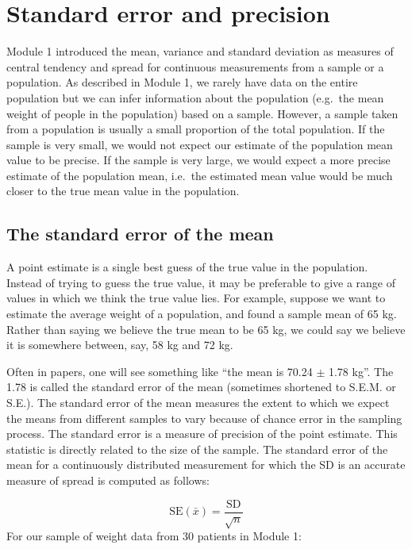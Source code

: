 \documentclass[
]{memoir}
\begin{document}
\hypertarget{standard-error-and-precision}{%
\section{Standard error and precision}\label{standard-error-and-precision}}

Module 1 introduced the mean, variance and standard deviation as measures of central tendency and spread for continuous measurements from a sample or a population. As described in Module 1, we rarely have data on the entire population but we can infer information about the population (e.g.~the mean weight of people in the population) based on a sample. However, a sample taken from a population is usually a small proportion of the total population. If the sample is very small, we would not expect our estimate of the population mean value to be precise. If the sample is very large, we would expect a more precise estimate of the population mean, i.e.~the estimated mean value would be much closer to the true mean value in the population.

\hypertarget{the-standard-error-of-the-mean}{%
\subsection{The standard error of the mean}\label{the-standard-error-of-the-mean}}

A point estimate is a single best guess of the true value in the population. Instead of trying to guess the true value, it may be preferable to give a range of values in which we think the true value lies. For example, suppose we want to estimate the average weight of a population, and found a sample mean of 65 kg. Rather than saying we believe the true mean to be 65 kg, we could say we believe it is somewhere between, say, 58 kg and 72 kg.

Often in papers, one will see something like ``the mean is 70.24 \(\pm\) 1.78 kg''. The 1.78 is called the standard error of the mean (sometimes shortened to S.E.M. or S.E.). The standard error of the mean measures the extent to which we expect the means from different samples to vary because of chance error in the sampling process. The standard error is a measure of precision of the point estimate. This statistic is directly related to the size of the sample. The standard error of the mean for a continuously distributed measurement for which the SD is an accurate measure of spread is computed as follows:

\[ \text{SE}(\bar{x}) = \frac{\text{SD}}{\sqrt{n}} \]
For our sample of weight data from 30 patients in Module 1:
\end{document}
